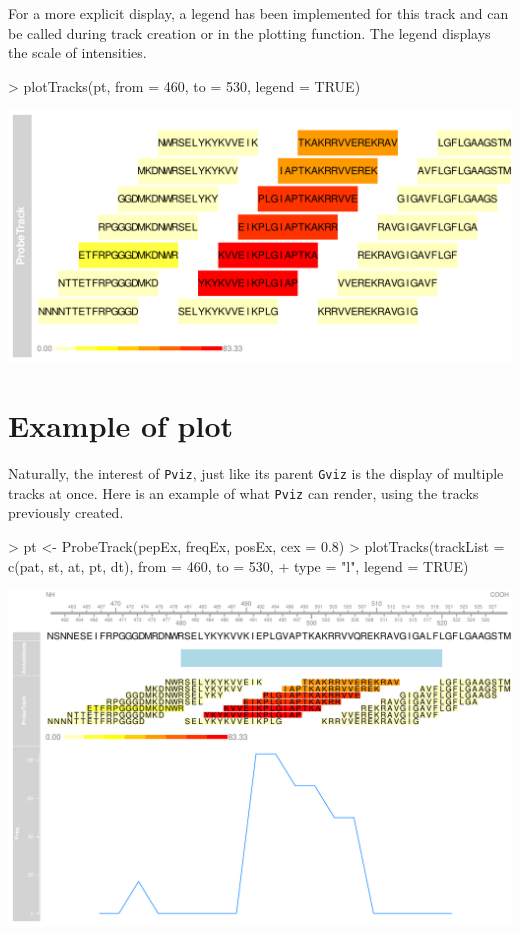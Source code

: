 \documentclass[11pt]{article}
\begin{document}
For a more explicit display, a legend has been implemented for this track and
can be called during track creation or in the plotting function. The legend
displays the scale of intensities.
\begin{Schunk}
\begin{Sinput}
> plotTracks(pt, from = 460, to = 530, legend = TRUE)
\end{Sinput}
\end{Schunk}
\includegraphics{Pviz-ProbeTrack-legend}





\section{Example of plot}
Naturally, the interest of \texttt{Pviz}, just like its parent \texttt{Gviz}
is the display of multiple tracks at once.
Here is an example of what \texttt{Pviz} can render, using the tracks previously
created.
\begin{Schunk}
\begin{Sinput}
> pt <- ProbeTrack(pepEx, freqEx, posEx, cex = 0.8)
> plotTracks(trackList = c(pat, st, at, pt, dt), from = 460, to = 530, 
+     type = "l", legend = TRUE)
\end{Sinput}
\end{Schunk}
\includegraphics{Pviz-complex-plot}
\end{document}
